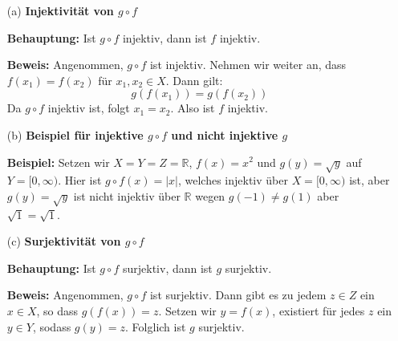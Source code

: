 \begin{itemize}
    \item[(a)] \textbf{Injektivität von \( g \circ f \)}
    
    \textbf{Behauptung:}
    Ist \( g \circ f \) injektiv, dann ist \( f \) injektiv.

    \textbf{Beweis:}
    Angenommen, \( g \circ f \) ist injektiv. Nehmen wir weiter an, dass \( f(x_1) = f(x_2) \) für \( x_1, x_2 \in X \). Dann gilt:
    \[
    g(f(x_1)) = g(f(x_2))
    \]
    Da \( g \circ f \) injektiv ist, folgt \( x_1 = x_2 \). Also ist \( f \) injektiv.

    \item[(b)] \textbf{Beispiel für injektive \( g \circ f \) und nicht injektive \( g \)}
    
    \textbf{Beispiel:}
    Setzen wir \( X = Y = Z = \mathbb{R} \), \( f(x) = x^2 \) und \( g(y) = \sqrt{y} \) auf \( Y = [0, \infty) \). Hier ist \( g \circ f(x) = |x| \), welches injektiv über \( X = [0, \infty) \) ist, aber \( g(y) = \sqrt{y} \) ist nicht injektiv über \( \mathbb{R} \) wegen \( g(-1) \neq g(1) \) aber \( \sqrt{1} = \sqrt{1} \).

    \item[(c)] \textbf{Surjektivität von \( g \circ f \)}
    
    \textbf{Behauptung:}
    Ist \( g \circ f \) surjektiv, dann ist \( g \) surjektiv.

    \textbf{Beweis:}
    Angenommen, \( g \circ f \) ist surjektiv. Dann gibt es zu jedem \( z \in Z \) ein \( x \in X \), so dass \( g(f(x)) = z \). Setzen wir \( y = f(x) \), existiert für jedes \( z \) ein \( y \in Y \), sodass \( g(y) = z \). Folglich ist \( g \) surjektiv.
\end{itemize}